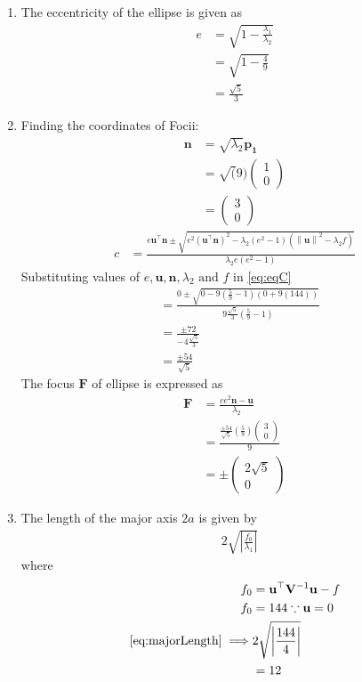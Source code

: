 \documentclass[12pt]{article}
\providecommand{\brak}[1]{\ensuremath{\left(#1\right)}}
\providecommand{\norm}[1]{\left\lVert#1\right\rVert}
\providecommand{\abs}[1]{\left\vert#1\right\vert}
\newcommand{\myvec}[1]{\ensuremath{\begin{pmatrix}#1\end{pmatrix}}}
\let\vec\mathbf
\begin{document}
\begin{enumerate}
\begin{enumerate}
\item The eccentricity of the ellipse is given as  
\begin{align}
	e &= \sqrt{1-\frac{\lambda_1}{\lambda_2}} \\
	  &= \sqrt{1-\frac{4}{9}} \\
          &= \frac{\sqrt{5}}{3}
\end{align}
\item Finding the coordinates of Focii: 
\begin{align}
	\vec{n} &= \sqrt{\lambda_2}\vec{p_1} \\
	&= \sqrt(9)\myvec{1 \\ 0} \\
	\label{eq:eqN}
	&= \myvec{3 \\ 0} 
\end{align}
\begin{align}
	\label{eq:eqC}
	c  &=    \frac{e\vec{u}^{\top}\vec{n} \pm \sqrt{e^2\brak{\vec{u}^{\top}\vec{n}}^2-\lambda_2\brak{e^2-1}\brak{\norm{\vec{u}}^2 - \lambda_2 f}}}{\lambda_2e\brak{e^2-1}} 
\end{align}
Substituting values of $e, \vec{u}, \vec{n}, \lambda_2 \text{ and } f$ in \eqref{eq:eqC}
\begin{align}
	&=    \frac{0 \pm \sqrt{0-9\brak{\frac{5}{9}-1}\brak{{0 + 9\brak{144}}}}}{9\frac{\sqrt{5}}{3}\brak{\frac{5}{9}-1}} \\ 
	&=    \frac{ \pm 72}{-4\frac{\sqrt{5}}{3}}  \\ 
	&=    \frac{ \pm 54}{\sqrt{5}} 
\end{align}
The focus $\vec{F}$ of ellipse is expressed as
\begin{align}
	\vec{F} &= \frac{ce^2\vec{n}-\vec{u}}{\lambda_2} \\
	&= \frac{\frac{ \pm 54}{\sqrt{5}} \brak{\frac{5}{9}}\myvec{3 \\0}}{9} \\
	&= \pm \myvec{2\sqrt{5} \\ 0}
\end{align}
\item  The length of the major axis $2a$ is given by
\begin{align}
	\label{eq:majorLength}
	& 2\sqrt{\abs{\frac{f_0}{\lambda_1}}}
\end{align}
where
\begin{align}
	 f_0 &= \vec{u}^\top\vec{V}^{-1}\vec{u}-f \\
	 f_0 &= 144 \because \vec{u} = 0 \\
	\eqref{eq:majorLength} \implies  & 2\sqrt{\abs{\frac{144}{4}}}\\
	&= 12
\end{align}


\end{enumerate}
\end{enumerate}
\end{document}

